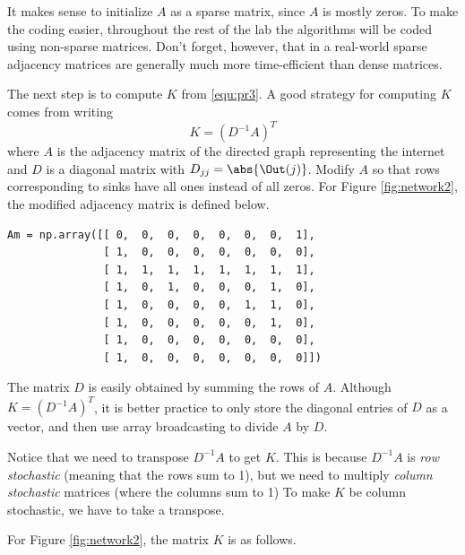 \begin{info}
It makes sense to initialize $A$ as a sparse matrix, since $A$ is mostly zeros. To make the coding easier, throughout the rest of the lab the algorithms will be coded using non-sparse matrices. Don't forget, however, that in a real-world sparse adjacency matrices are generally much more time-efficient than dense matrices.
\end{info}

The next step is to compute $K$ from \eqref{equ:pr3}.
A good strategy for computing $K$ comes from writing
\[
K = (D^{-1}A)^T
\]
where $A$ is the adjacency matrix of the directed graph representing the internet and $D$ is a diagonal matrix with $D_{jj}=\abs{\Out(j)}$.
Modify $A$ so that rows corresponding to sinks have all ones instead of all zeros.
For Figure \ref{fig:network2}, the modified adjacency matrix is defined below.
\begin{lstlisting}
Am = np.array([[ 0,  0,  0,  0,  0,  0,  0,  1],
               [ 1,  0,  0,  0,  0,  0,  0,  0],
               [ 1,  1,  1,  1,  1,  1,  1,  1],
               [ 1,  0,  1,  0,  0,  0,  1,  0],
               [ 1,  0,  0,  0,  0,  1,  1,  0],
               [ 1,  0,  0,  0,  0,  0,  1,  0],
               [ 1,  0,  0,  0,  0,  0,  0,  0],
               [ 1,  0,  0,  0,  0,  0,  0,  0]])
\end{lstlisting}


The matrix $D$ is easily obtained by summing the rows of $A$.
Although  $K=(D^{-1}A)^T$, it is better practice to only store the diagonal entries of $D$ as a vector, and then use array broadcasting to divide $A$ by $D$.

Notice that we need to transpose $D^{-1}A$ to get $K$. This is because $D^{-1}A$ is \emph{row stochastic} (meaning that  the rows sum to 1), but we need to multiply \emph{column stochastic} matrices (where the columns sum to 1) To make $K$ be column stochastic, we have to take a transpose.

For Figure \ref{fig:network2}, the matrix $K$ is as follows.

